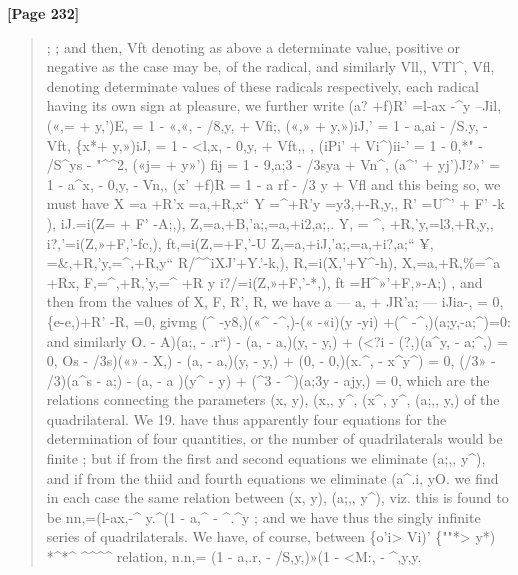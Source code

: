 \documentclass[11pt,a4paper]{book}
\begin{document}
\textbf{[Page 232]}\\[0.2cm]
\begin{quote}
; ;
and then, Vft denoting as above a determinate value, positive or negative as the case
may be, of the radical, and similarly Vll,, VTl\textasciicircum{}, Vfl, denoting determinate values of
these radicals respectively, each radical having its own sign at pleasure, we further
write
(a? +f)R' =l-ax -\textasciicircum{}y --Jil, («,= + y,')E, = 1 - «,«, - /8,y, + Vfi;,
(«,» + y,»)iJ,' = 1 - a,ai - /S.y, - Vft, \{x*+ y,»)iJ, = 1 - <l,x, - 0,y, + Vft,,
,
(iPi' + Vi\textasciicircum{})ii-' = 1 - 0,*" - /S\textasciicircum{}ys - "\textasciicircum{}\textasciicircum{}2, («j= + y»') fij = 1 - 9,a;3 - /3sya + Vn\textasciicircum{},
(a\textasciicircum{}' + yj')J?»' = 1 - a\textasciicircum{}x, - 0,y, - Vn,, (x' +f)R = 1 - a rf - /3 y + Vfl
and this being so, we must have
X =a +R'x =a,+R,x`` Y =\textasciicircum{}+R'y =y3,+-R,y,, R' =U\textasciicircum{}' + F' -k ), iJ.=i(Z= + F' -A;,),
Z,=a,+B,'a;,=a,+i2,a;,. Y, = \textasciicircum{}, +R,'y,=l3,+R,y,, i?,'=i(Z,»+F,'-fc,), ft,=i(Z,=+F,'-U
Z,=a,+iJ,'a;,=a,+i?,a;`` ¥, =\&,+R,'y,=\textasciicircum{},+R,y`` R/\textasciicircum{}\textasciicircum{}iXJ'+Y.'-k,), R,=i(X,'+Y\textasciicircum{}-h),
X,=a,+R,\%=\textasciicircum{}a +Rx, F,=\textasciicircum{},+R,'y,=\textasciicircum{} +R y i?/=i(Z,»+F,'-*,), ft =H\textasciicircum{}»'+F,»-A;)
,
and then from the values of X, F, R', R, we have
a --- a, + JR'a; --- iJia-, = 0,
\{e-e,)+R' -R, =0,
givmg
(\textasciicircum{} -y8,)(«\textasciicircum{} -\textasciicircum{},)-(« -«i)(y -yi) +(\textasciicircum{} -\textasciicircum{},)(a;y,-a;\textasciicircum{})=0:
and similarly
O. - A)(a;, - .r``) - (a, - a,)(y, - y,) + (<?i - (?,)(a\textasciicircum{}y, - a;\textasciicircum{},) = 0,
Os - /3s)(«» - X,) - (a, - a,)(y, - y,) + (0, - 0,)(x.\textasciicircum{}, - x\textasciicircum{}y\textasciicircum{}) = 0,
(/3» - /3)(a\textasciicircum{}s - a;) - (a, - a )(y\textasciicircum{} - y) + (\textasciicircum{}3 - \textasciicircum{})(a;3y - ajy,) = 0,
which are the relations connecting the parameters (x, y), (x,, y\textasciicircum{}, (x\textasciicircum{}, y\textasciicircum{}, (a;,, y,) of the
quadrilateral.
We
19. have thus apparently four equations for the determination of four quantities,
or the number of quadrilaterals would be finite ; but if from the first and second
equations we eliminate (a;,, y\textasciicircum{}), and if from the thiid and fourth equations we eliminate
(a\textasciicircum{}.i, yO. we find in each case the same relation between (x, y), (a;,, y\textasciicircum{}), viz. this is
found to be
nn,=(l-ax,-\textasciicircum{}
y.\textasciicircum{}(1
-
a,\textasciicircum{}
-
\textasciicircum{}.\textasciicircum{}y
;
and we have thus the singly infinite series of quadrilaterals. We have, of course, between
\{o'i> Vi)' \{""*> y*) *\textasciicircum{}*\textasciicircum{} \textasciicircum{}\textasciicircum{}\textasciicircum{}\textasciicircum{} relation,
n.n,=
(1
-
a,.r,
-
/S,y,)»(1
-
<M:,
-
\textasciicircum{},y,y.
\end{quote}
\end{document}
